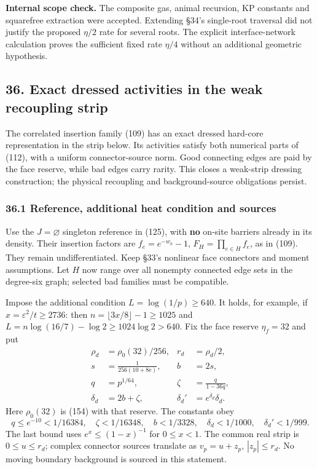 \documentclass[11pt,a4paper]{article}
\begin{document}
\textbf{Internal scope check.} The composite gas, animal recursion, KP
constants and squarefree extraction were accepted. Extending §34's
single-root traversal did not justify the proposed \(\eta/2\) rate for
several roots. The explicit interface-network calculation proves the
sufficient fixed rate \(\eta/4\) without an additional geometric
hypothesis.

\hypertarget{exact-dressed-activities-in-the-weak-recoupling-strip}{%
\subsection{36. Exact dressed activities in the weak recoupling
strip}\label{exact-dressed-activities-in-the-weak-recoupling-strip}}

The correlated insertion family (109) has an exact dressed hard-core
representation in the strip below. Its activities satisfy both numerical
parts of (112), with a uniform connector-source norm. Good connecting
edges are paid by the face reserve, while bad edges carry rarity. This
closes a weak-strip dressing construction; the physical recoupling and
background-source obligations persist.

\hypertarget{reference-additional-heat-condition-and-sources}{%
\subsubsection{36.1 Reference, additional heat condition and
sources}\label{reference-additional-heat-condition-and-sources}}

Use the \(J=\varnothing\) singleton reference in (125), with \textbf{no}
on-site barriers already in its density. Their insertion factors are
\(f_e=e^{-w_k}-1\), \(F_H=\prod_{e\in H}f_e\), as in (109). They remain
undifferentiated. Keep §33's nonlinear face connectors and moment
assumptions. Let \(H\) now range over all nonempty connected edge sets
in the degree-six graph; selected bad families must be compatible.

Impose the additional condition \(L=\log(1/p)\ge640\). It holds, for
example, if \(x=\varepsilon^2/t\ge2736\): then
\(n=\lfloor3x/8\rfloor-1\ge1025\) and
\(L=n\log(16/7)-\log2\ge1024\log2>640\). Fix the face reserve
\(\eta_f=32\) and put \[\begin{aligned}
\rho_d&=\rho_0(32)/256,& r_d&=\rho_d/2,\\
s&=\frac1{256(10+8\mathrm e)},& b&=2s,\\
q&=p^{1/64},&\zeta&=\frac{q}{1-36q},\\
\delta_d&=2b+\zeta,&\delta_d'&=e^{\delta_d}\delta_d.
\end{aligned}\tag{167}\] Here \(\rho_0(32)\) is (154) with that reserve.
The constants obey \[q\le e^{-10}<1/16384,\quad \zeta<1/16348,\quad
b<1/3328,\quad\delta_d<1/1000,\quad\delta_d'<1/999.\] The last bound
uses \(e^x\le(1-x)^{-1}\) for \(0\le x<1\). The common real strip is
\(0\le u\le r_d\); complex connector sources translate as \(v_p=u+z_p\),
\(|z_p|\le r_d\). No moving boundary background is sourced in this
statement.
\end{document}

